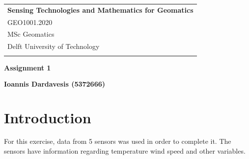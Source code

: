 \documentclass[a4paper,12pt]{article} %
\begin{document}



\thispagestyle{empty} %

\begin{tabular}{p{15.5cm}} %
{\large \bf Sensing Technologies and Mathematics for Geomatics} \\
GEO1001.2020 \\ MSc Geomatics \\ Delft University of Technology \\
\hline %
\\
\end{tabular} %

\vspace*{8cm} %

\begin{center} %
	{\Large \bf Assignment 1} %
	\vspace{2mm}
	
	{\bf Ioannis Dardavesis (5372666)} %
		
\end{center}  

\vspace{0.4cm}




\pagebreak
\section{ Introduction}
 For this exercise, data from 5 sensors\cite{Maiullari2020} was used in order to complete it. The sensors have information regarding temperature wind speed and other variables.
 
\end{document}
